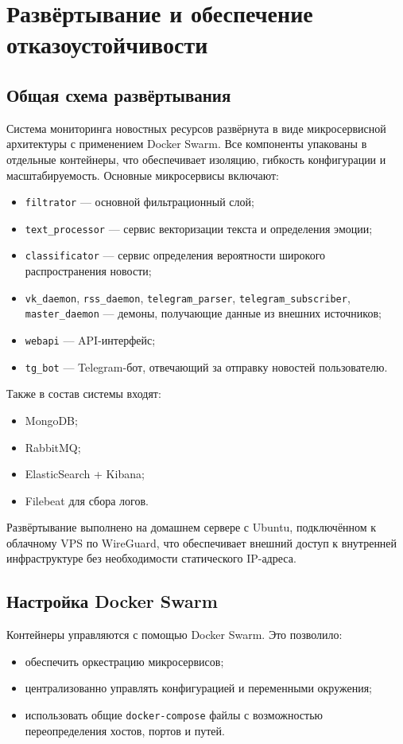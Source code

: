 \newpage

\section{Развёртывание и обеспечение отказоустойчивости}

\subsection{Общая схема развёртывания}
Система мониторинга новостных ресурсов развёрнута в виде микросервисной архитектуры с применением Docker Swarm.
Все компоненты упакованы в отдельные контейнеры, что обеспечивает изоляцию, гибкость конфигурации и масштабируемость.
Основные микросервисы включают:
\begin{itemize}
  \item \texttt{filtrator} — основной фильтрационный слой;
  \item \texttt{text\_processor} — сервис векторизации текста и определения эмоции;
  \item \texttt{classificator} — сервис определения вероятности широкого распространения новости;
  \item \texttt{vk\_daemon}, \texttt{rss\_daemon}, \texttt{telegram\_parser}, \texttt{telegram\_subscriber}, \texttt{master\_daemon} — демоны, получающие данные из внешних источников;
  \item \texttt{webapi} — API-интерфейс;
  \item \texttt{tg\_bot} — Telegram-бот, отвечающий за отправку новостей пользователю.
\end{itemize}

Также в состав системы входят:
\begin{itemize}
  \item MongoDB;
  \item RabbitMQ;
  \item ElasticSearch + Kibana;
  \item Filebeat для сбора логов.
\end{itemize}

Развёртывание выполнено на домашнем сервере с Ubuntu, подключённом к облачному VPS по WireGuard, что обеспечивает внешний доступ к внутренней инфраструктуре без необходимости статического IP-адреса.

\subsection{Настройка Docker Swarm}
Контейнеры управляются с помощью Docker Swarm.
Это позволило:
\begin{itemize}
  \item обеспечить оркестрацию микросервисов;
  \item централизованно управлять конфигурацией и переменными окружения;
  \item использовать общие \texttt{docker-compose} файлы с возможностью переопределения хостов, портов и путей.
\end{itemize}

